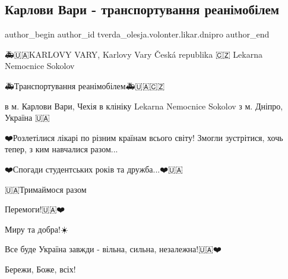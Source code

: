  
 
 
 
 

\subsection{Карлови Вари - транспортування реанімобілем}
\label{sec:24_12_2022.fb.tverda_olesja.volonter.likar.dnipro.1.karlovi_vari___trans}

\ifcmt
 author_begin
   author_id tverda_olesja.volonter.likar.dnipro
 author_end
\fi

🚑🇺🇦KARLOVY VARY, Karlovy Vary Česká republika 🇨🇿 Lekarna Nemocnice
Sokolov🏥

🚑Транспортування реанімобілем🚑🇺🇦🇨🇿

в м. Карлови Вари, Чехія в клініку Lekarna Nemocnice Sokolov з м. Дніпро,
Україна 🇺🇦

❤️Розлетілися лікарі по різним країнам всього світу! Змогли зустрітися, хочь
тепер, з ким навчалися разом...

❤️Спогади студентських років та дружба...❤️🇺🇦

🇺🇦Тримаймося разом💛💙

Перемоги!🇺🇦❤️

Миру та добра!☀️

Все буде Україна завжди - вільна, сильна, незалежна!🇺🇦❤️

Бережи, Боже, всіх!🙏
